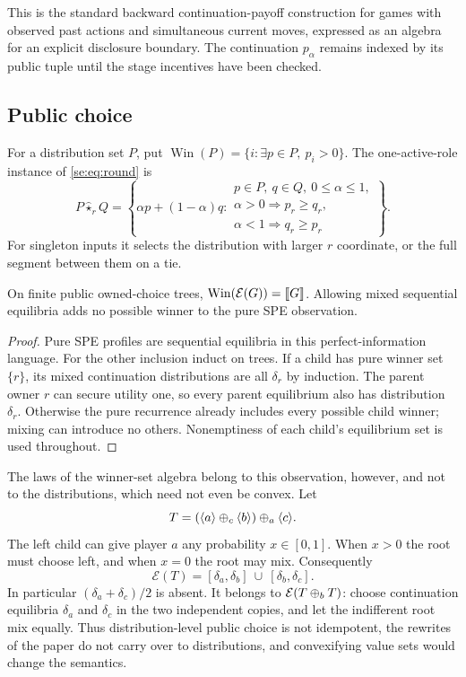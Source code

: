 This is the standard backward continuation-payoff construction for games with observed past actions and simultaneous current moves, expressed as an algebra for an explicit disclosure boundary. The continuation $p_\alpha$ remains indexed by its public tuple until the stage incentives have been checked.

\subsection{Public choice}

For a distribution set $P$, put $\operatorname{Win}(P)=\{i:\exists p\in P,\ p_i>0\}$. The one-active-role instance of \eqref{se:eq:round} is
\begin{equation}\label{se:eq:public}
 P\mathbin{\widehat\star_r}Q=
 \left\{\alpha p+(1-\alpha)q:
 \begin{array}{l}
 p\in P,\ q\in Q,\ 0\leq\alpha\leq1,\\
 \alpha>0\Rightarrow p_r\geq q_r,\\
 \alpha<1\Rightarrow q_r\geq p_r
 \end{array}\right\}.
\end{equation}
For singleton inputs it selects the distribution with larger $r$ coordinate, or the full segment between them on a tie.

\begin{corollary}\label{se:cor:public}
On finite public owned-choice trees,
$\operatorname{Win}(\mathcal E(G))=\llbracket G\rrbracket$. Allowing mixed sequential
equilibria adds no possible winner to the pure SPE observation.
\end{corollary}
\begin{proof}
Pure SPE profiles are sequential equilibria in this perfect-information
language. For the other inclusion induct on trees. If a child has pure
winner set $\{r\}$, its mixed continuation distributions are all
$\delta_r$ by induction. The parent owner $r$ can secure utility one,
so every parent equilibrium also has distribution $\delta_r$.
Otherwise the pure recurrence already includes every possible child
winner; mixing can introduce no others. Nonemptiness of each child's
equilibrium set is used throughout.
\end{proof}

The laws of the winner-set algebra belong to this observation, however, and not to the distributions, which need not even be convex. Let
\[
 T=(\langle a\rangle\mathbin{\oplus_{c}}\langle b\rangle)\mathbin{\oplus_{a}}\langle c\rangle.
\]
The left child can give player $a$ any probability $x\in[0,1]$. When $x>0$ the root must choose left, and when $x=0$ the root may mix. Consequently
\begin{equation}\label{se:eq:nonconvex}
 \mathcal E(T)=
 [\delta_a,\delta_b]\ \cup\ [\delta_b,\delta_c].
\end{equation}
In particular $(\delta_a+\delta_c)/2$ is absent. It belongs to $\mathcal E(T\mathbin{\oplus_{b}} T)$: choose continuation equilibria $\delta_a$ and $\delta_c$ in the two independent copies, and let the indifferent root mix equally. Thus distribution-level public choice is not idempotent, the rewrites of the paper do not carry over to distributions, and convexifying value sets would change the semantics.

